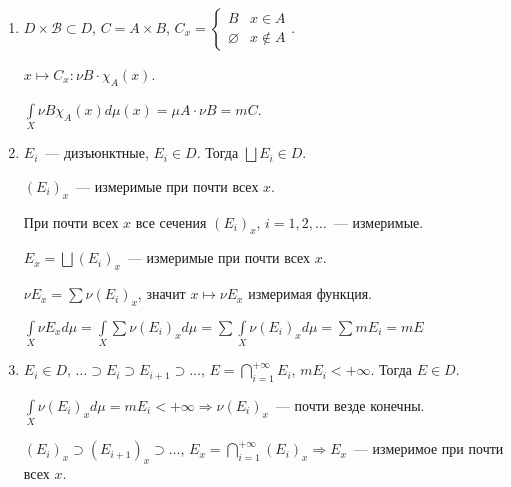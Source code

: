 \documentclass{article}
\begin{document}
            \begin{enumerate}
            
                \item $D \times \mathcal{B} \subset D$, $C = A \times B$, $C_x = 
                                                                        \begin{cases}
                                                                            B & x \in A \\ 
                                                                            \varnothing & x \notin A
                                                                        \end{cases}$.
                
                    $x \longmapsto C_x: \nu B \cdot \chi_A(x)$.
                    
                    $\int\limits_{X} \nu B \chi_A(x) d \mu(x) = \mu A \cdot \nu B = m C$.
                    
                \item $E_i$~--- дизъюнктные, $E_i \in D$. Тогда $\bigsqcup E_i \in D$.
                
                    $(E_i)_x$~--- измеримые при почти всех $x$. 
                    
                    При почти всех $x$ все сечения $(E_i)_x$, $i = 1, 2, \ldots$~--- измеримые.
                    
                    $E_x = \bigsqcup (E_i)_x$~--- измеримые при почти всех $x$.
                    
                    $\nu E_x = \sum \nu (E_i)_x$, значит $x \mapsto \nu E_x$ измеримая функция.
                    
                    $\int\limits_{X} \nu E_x d \mu = \int\limits_{X} \sum \nu (E_i)_x d \mu = \sum \int\limits_{X} \nu (E_i)_x d \mu = \sum m E_i = m E$
                
                \item $E_i \in D$, $\ldots \supset E_i \supset E_{i + 1} \supset \ldots$, $E = \bigcap\limits^{+\infty}_{i = 1} E_i$, $m E_i < +\infty$. Тогда $E \in D$.
                
                    $\int\limits_{X} \nu (E_i)_x d\mu = m E_i < +\infty \Rightarrow \nu (E_i)_x$~--- почти везде конечны.
                    
                    $(E_i)_x \supset (E_{i + 1})_x \supset \ldots$, $E_x = \bigcap\limits^{+\infty}_{i = 1} (E_i)_x \Rightarrow E_x$~--- измеримое при почти всех $x$.
                    

\end{enumerate}
\end{document}
